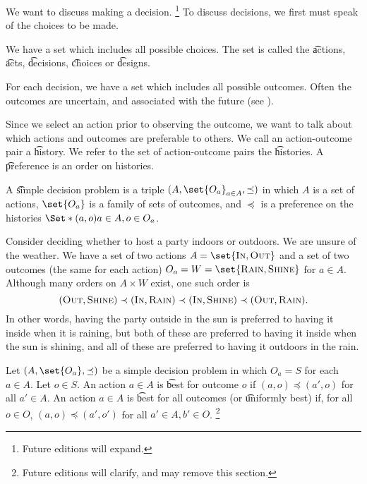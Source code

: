 

We want to discuss making a decision.
  \ifhmode\unskip\fi\footnote{
Future editions will expand.
  }
To discuss decisions, we first must speak of the choices to be made.


We have a set which includes all possible choices.
The set is called the \t{actions}, \t{acts}, \t{decisions}, \t{choices} or \t{designs}.

For each decision, we have a set which includes all possible outcomes.
Often the outcomes are uncertain, and associated with the future (see ).

Since we select an action prior to observing the outcome, we want to talk about which actions and outcomes are preferable to others.
We call an action-outcome pair a \t{history}.
We refer to the set of action-outcome pairs the \t{histories}.
A \t{preference} is an order on histories.

A \t{simple decision problem} is a triple $(A, \set{O_a}_{a \in A}, \preceq)$ in which $A$ is a set of actions, $\set{O_a}$ is a family of sets of outcomes, and $\preceq$ is a preference on the histories $\Set*{(a, o)}{a \in A, o \in O_a}$.



Consider deciding whether to host a party indoors or outdoors.
We are unsure of the weather.
We have a set of two actions $A = \set{\textsc{In}, \textsc{Out}}$ and a set of two outcomes (the same for each action) $O_a = W = \set{\textsc{Rain}, \textsc{Shine}}$ for $a \in A$.
Although many orders on $A \times  W$ exist, one such order is
  \[
(\textsc{Out}, \textsc{Shine}) \prec (\textsc{In}, \textsc{Rain}) \prec (\textsc{In}, \textsc{Shine}) \prec (\textsc{Out}, \textsc{Rain}).
  \]
In other words, having the party outside in the sun is preferred to having it inside when it is raining, but both of these are preferred to having it inside when the sun is shining, and all of these are preferred to having it outdoors in the rain.


Let $(A, \set{O_a}, \preceq)$ be a simple decision problem in which $O_a = S$ for each $a \in A$.
Let $o \in S$.
An action $a \in A$ is \t{best for outcome $o$} if $(a, o) \preceq (a', o)$ for all $a' \in A$.
An action $a \in A$ is \t{best for all outcomes} (or \t{uniformly best}) if, for all $o \in O$, $(a, o) \preceq (a', o')$ for all $a' \in A, b' \in O$.
  \ifhmode\unskip\fi\footnote{
Future editions will clarify, and may remove this section.
  }

